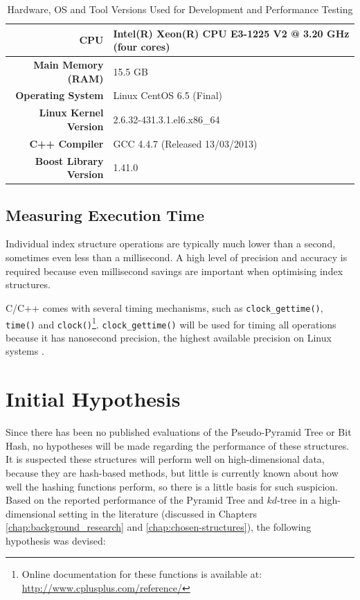 \begin{table}
	\centering
	\begin{tabular}{|r|l|}
		\hline
		\textbf{CPU} & Intel(R) Xeon(R) CPU E3-1225 V2 @ 3.20 GHz (four cores) \\
		\hline
		\textbf{Main Memory (RAM)} & 15.5 GB \\
		\hline
		\textbf{Operating System} & Linux CentOS 6.5 (Final) \\
		\hline
		\textbf{Linux Kernel Version} & 2.6.32-431.3.1.el6.x86\_64 \\
		\hline
		\textbf{C++ Compiler} & GCC 4.4.7 (Released 13/03/2013) \\
		\hline
		\textbf{Boost Library Version} & 1.41.0 \\
		\hline
	\end{tabular}
	\caption{Hardware, OS and Tool Versions Used for Development and Performance Testing}
	\label{tab:system-specifications}
\end{table}

\subsection{Measuring Execution Time}

Individual index structure operations are typically much lower than a second, sometimes even less than a millisecond. A high level of precision and accuracy is required because even millisecond savings are important when optimising index structures.

C/C++ comes with several timing mechanisms, such as \texttt{clock\_gettime()}, \texttt{time()} and \texttt{clock()}\footnote{Online documentation for these functions is available at: \url{http://www.cplusplus.com/reference/}}. \texttt{clock\_gettime()} will be used for timing all operations because it has nanosecond precision, the highest available precision on Linux systems \cite{clockgettime-fastest1,clockgettime-fastest2}.

\section{Initial Hypothesis}
\label{sec:initial-hypothesis}

Since there has been no published evaluations of the Pseudo-Pyramid Tree or Bit Hash, no hypotheses will be made regarding the performance of these structures. It is suspected these structures will perform well on high-dimensional data, because they are hash-based methods, but little is currently known about how well the hashing functions perform, so there is a little basis for such suspicion. Based on the reported performance of the Pyramid Tree and $kd$-tree in a high-dimensional setting in the literature (discussed in Chapters \ref{chap:background_research} and \ref{chap:chosen-structures}), the following hypothesis was devised:

